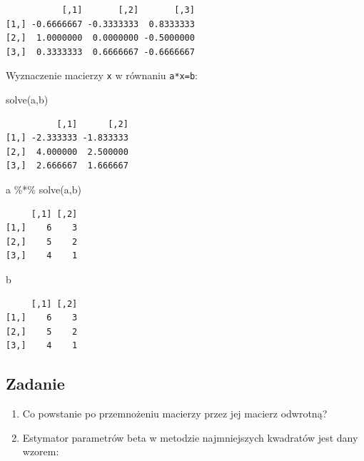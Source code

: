 \documentclass[
  letterpaper,
  DIV=11,
  numbers=noendperiod]{scrreprt}
\newenvironment{Shaded}{\begin{snugshade}}{\end{snugshade}}
\newcommand{\FunctionTok}[1]{\textcolor[rgb]{0.28,0.35,0.67}{#1}}
\newcommand{\NormalTok}[1]{\textcolor[rgb]{0.00,0.23,0.31}{#1}}
\newcommand{\SpecialCharTok}[1]{\textcolor[rgb]{0.37,0.37,0.37}{#1}}
\providecommand{\tightlist}{%
  \setlength{\itemsep}{0pt}\setlength{\parskip}{0pt}}\usepackage{longtable,booktabs,array}
\begin{document}
\begin{verbatim}
           [,1]       [,2]       [,3]
[1,] -0.6666667 -0.3333333  0.8333333
[2,]  1.0000000  0.0000000 -0.5000000
[3,]  0.3333333  0.6666667 -0.6666667
\end{verbatim}

Wyznaczenie macierzy \texttt{x} w równaniu \texttt{a*x=b}:

\begin{Shaded}
\begin{Highlighting}[]
\FunctionTok{solve}\NormalTok{(a,b)}
\end{Highlighting}
\end{Shaded}

\begin{verbatim}
          [,1]      [,2]
[1,] -2.333333 -1.833333
[2,]  4.000000  2.500000
[3,]  2.666667  1.666667
\end{verbatim}

\begin{Shaded}
\begin{Highlighting}[]
\NormalTok{a }\SpecialCharTok{\%*\%} \FunctionTok{solve}\NormalTok{(a,b)}
\end{Highlighting}
\end{Shaded}

\begin{verbatim}
     [,1] [,2]
[1,]    6    3
[2,]    5    2
[3,]    4    1
\end{verbatim}

\begin{Shaded}
\begin{Highlighting}[]
\NormalTok{b}
\end{Highlighting}
\end{Shaded}

\begin{verbatim}
     [,1] [,2]
[1,]    6    3
[2,]    5    2
[3,]    4    1
\end{verbatim}

\hypertarget{zadanie}{%
\subsection{Zadanie}\label{zadanie}}

\begin{enumerate}
\def\labelenumi{\arabic{enumi}.}
\tightlist
\item
  Co powstanie po przemnożeniu macierzy przez jej macierz odwrotną?
\item
  Estymator parametrów beta w metodzie najmniejszych kwadratów jest dany
  wzorem:
\end{enumerate}
\end{document}
